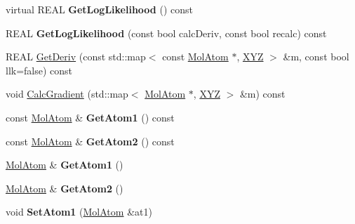 \begin{DoxyCompactItemize}
\mbox{\label{class_obj_cryst_1_1_mol_bond_a64b6e8a6cb02eeee4d6b6b5f12af8da7}} 
virtual R\+E\+AL {\bfseries Get\+Log\+Likelihood} () const
\item 
\mbox{\label{class_obj_cryst_1_1_mol_bond_a0bfc05d216bbc164d356a56c5ba87eeb}} 
R\+E\+AL {\bfseries Get\+Log\+Likelihood} (const bool calc\+Deriv, const bool recalc) const
\item 
R\+E\+AL \mbox{\hyperlink{class_obj_cryst_1_1_mol_bond_a532cca2653bed88fe6fe82896abef6ee}{Get\+Deriv}} (const std\+::map$<$ const \mbox{\hyperlink{class_obj_cryst_1_1_mol_atom}{Mol\+Atom}} $\ast$, \mbox{\hyperlink{struct_obj_cryst_1_1_x_y_z}{X\+YZ}} $>$ \&m, const bool llk=false) const
\item 
void \mbox{\hyperlink{class_obj_cryst_1_1_mol_bond_ab246b6300512a83e2edacd3a8bb99e94}{Calc\+Gradient}} (std\+::map$<$ \mbox{\hyperlink{class_obj_cryst_1_1_mol_atom}{Mol\+Atom}} $\ast$, \mbox{\hyperlink{struct_obj_cryst_1_1_x_y_z}{X\+YZ}} $>$ \&m) const
\item 
\mbox{\label{class_obj_cryst_1_1_mol_bond_a2b53869db0042aad0f4651f38f0aaef3}} 
const \mbox{\hyperlink{class_obj_cryst_1_1_mol_atom}{Mol\+Atom}} \& {\bfseries Get\+Atom1} () const
\item 
\mbox{\label{class_obj_cryst_1_1_mol_bond_aef74a750029c20a0d05921ac302d8a0d}} 
const \mbox{\hyperlink{class_obj_cryst_1_1_mol_atom}{Mol\+Atom}} \& {\bfseries Get\+Atom2} () const
\item 
\mbox{\label{class_obj_cryst_1_1_mol_bond_a30444453034b4bef92b40578550cef89}} 
\mbox{\hyperlink{class_obj_cryst_1_1_mol_atom}{Mol\+Atom}} \& {\bfseries Get\+Atom1} ()
\item 
\mbox{\label{class_obj_cryst_1_1_mol_bond_a38471ebc522e71cf732bf9643edc61fd}} 
\mbox{\hyperlink{class_obj_cryst_1_1_mol_atom}{Mol\+Atom}} \& {\bfseries Get\+Atom2} ()
\item 
\mbox{\label{class_obj_cryst_1_1_mol_bond_a134d996eddce994d967b4b3f4358a3dd}} 
void {\bfseries Set\+Atom1} (\mbox{\hyperlink{class_obj_cryst_1_1_mol_atom}{Mol\+Atom}} \&at1)

\end{DoxyCompactItemize}
